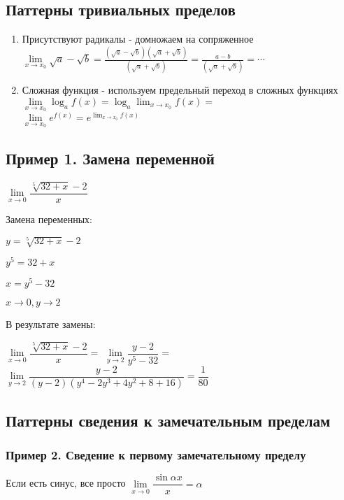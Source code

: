 \subsection{Паттерны тривиальных пределов}

\begin{enumerate}
\item 
Присутствуют радикалы - домножаем на сопряженное
$\lim\limits_{x\to x_0} \sqrt{a} - \sqrt{b} = 
\frac{(\sqrt{a} - \sqrt{b})(\sqrt{a} + \sqrt{b})}{(\sqrt{a} + \sqrt{b})} =
\frac{a - b}{(\sqrt{a} + \sqrt{b})}  = \cdots $

\item 
Сложная функция - используем предельный переход в сложных функциях
$ \lim\limits_{x\to x_0} \log_a{f(x)} =  \log_a {\lim_{x\to x_0} {f(x)} } =  $ \\
$ \lim\limits_{x\to x_0} e^{f(x)} =  e^ {\lim_{x\to x_0} {f(x)} }  $

\end{enumerate}


\subsection{Пример 1. Замена переменной}

$ \lim\limits_{x\to 0} \dfrac{ \sqrt[5]{32+x} - 2 }{x} $

Замена переменных:

$ y = \sqrt[5]{32+x} - 2 $

$ y^{5} = 32+x $

$ x = y^{5} - 32 $

$ x \to 0, y \to 2 $

В результате замены:

$ \lim\limits_{x\to 0} \dfrac{ \sqrt[5]{32+x} - 2 }{x} = $
$ \lim\limits_{y\to 2} \dfrac{ y - 2 }{ y^{5} - 32 } =  $
$ \lim\limits_{y\to 2} \dfrac{ y - 2 }{ (y - 2)(y^{4}-2y^{3}+4y^{2}+8+16) } = \dfrac{1}{80}  $

\subsection{Паттерны сведения к замечательным пределам}

\subsubsection{Пример 2. Сведение к первому замечательному пределу}

Если есть синус, все просто
$ \lim\limits_{x\to 0} \dfrac{ \sin{\alpha x} }{x} = \alpha $

